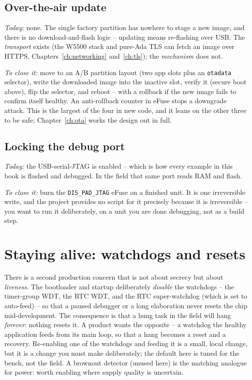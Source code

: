 \subsection{Over-the-air update}\label{prod:ota}

\emph{Today:} none. The single factory partition has nowhere to stage a new image,
and there is no download-and-flash logic -- updating means re-flashing over USB.
The \emph{transport} exists (the W5500 stack and pure-Ada TLS can fetch an image
over HTTPS, Chapters~\ref{ch:networking} and~\ref{ch:tls}); the \emph{mechanism}
does not.

\emph{To close it:} move to an A/B partition layout (two app slots plus an
\texttt{otadata} selector), write the downloaded image into the inactive slot,
verify it (secure boot above), flip the selector, and reboot -- with a rollback if
the new image fails to confirm itself healthy. An anti-rollback counter in eFuse
stops a downgrade attack. This is the largest of the four in new code, and it leans
on the other three to be safe; Chapter~\ref{ch:ota} works the design out in full.

\subsection{Locking the debug port}

\emph{Today:} the USB-serial-JTAG is enabled -- which is how every example in this
book is flashed and debugged. In the field that same port reads RAM and flash.

\emph{To close it:} burn the \texttt{DIS\_PAD\_JTAG} eFuse on a finished unit. It is
one irreversible write, and the project provides no script for it precisely because
it is irreversible -- you want to run it deliberately, on a unit you are done
debugging, not as a build step.

\section{Staying alive: watchdogs and resets}

There is a second production concern that is not about secrecy but about
\emph{liveness}. The bootloader and startup deliberately \emph{disable} the
watchdogs -- the timer-group WDT, the RTC WDT, and the RTC super-watchdog (which is
set to auto-feed) -- so that a paused debugger or a long elaboration never resets the
chip mid-development. The consequence is that a hung task in the field will hang
\emph{forever}: nothing resets it. A product wants the opposite -- a watchdog the
healthy application feeds from its main loop, so that a hang becomes a reset and a
recovery. Re-enabling one of the watchdogs and feeding it is a small, local change,
but it is a change you must make deliberately; the default here is tuned for the
bench, not the field. A brownout detector (unused here) is the matching
analogue for power: worth enabling where supply quality is uncertain.

